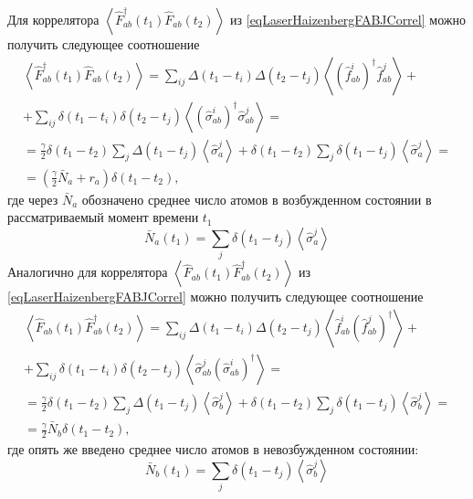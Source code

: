 Для коррелятора 
$\left<\hat{F}_{ab}^{\dag}\left(t_1\right)\hat{F}_{ab}\left(t_2\right)\right>$
из \eqref{eqLaserHaizenbergFABJCorrel} можно получить следующее
соотношение
\begin{eqnarray}
\left<\hat{F}_{ab}^{\dag}\left(t_1\right)\hat{F}_{ab}\left(t_2\right)\right>
= \sum_{ij}\Delta\left(t_1 - t_i\right)\Delta\left(t_2 -
t_j\right)\left<\left(\hat{f}^{i}_{ab}\right)^{\dag}\hat{f}^{j}_{ab}\right>
+
\nonumber \\
+ 
\sum_{ij} \delta\left(t_1 - t_i\right)\delta\left(t_2 - t_j\right)
\left<\left(\hat{\sigma}^{i}_{ab}\right)^{\dag}\hat{\sigma}^{j}_{ab}\right>
= 
\nonumber \\
=
\frac{\gamma}{2}\delta\left(t_1 - t_2\right)\sum_{j}\Delta\left(t_1 -
t_j\right)\left<\hat{\sigma}^{j}_{a}\right> +
\delta\left(t_1 - t_2\right) \sum_{j} \delta\left(t_1 - t_j\right)
\left<\hat{\sigma}^{j}_{a}\right> 
=
\nonumber \\
= 
\left(
\frac{\gamma}{2}\bar{N}_a + r_a
\right)\delta\left(t_1 - t_2\right),
\label{eqLaserHaizenbergFABCorrel_1}
\end{eqnarray}
где через $\bar{N}_a$ обозначено среднее число атомов в возбужденном
состоянии в рассматриваемый момент времени $t_1$
\begin{equation}
\bar{N}_a\left(t_1\right) = \sum_{j} \delta\left(t_1 - t_j\right)
\left<\hat{\sigma}^{j}_{a}\right>
\nonumber 
\end{equation}
Аналогично для коррелятора 
$\left<\hat{F}_{ab}\left(t_1\right)\hat{F}_{ab}^{\dag}\left(t_2\right)\right>$
из \eqref{eqLaserHaizenbergFABJCorrel} можно получить следующее
соотношение
\begin{eqnarray}
\left<\hat{F}_{ab}\left(t_1\right)\hat{F}_{ab}^{\dag}\left(t_2\right)\right>
= \sum_{ij}\Delta\left(t_1 - t_i\right)\Delta\left(t_2 -
t_j\right)\left<\hat{f}^{i}_{ab}\left(\hat{f}^{j}_{ab}\right)^{\dag}\right>
+
\nonumber \\
+ 
\sum_{ij} \delta\left(t_1 - t_i\right)\delta\left(t_2 - t_j\right)
\left<\hat{\sigma}^{j}_{ab}\left(\hat{\sigma}^{i}_{ab}\right)^{\dag}\right>
= 
\nonumber \\
=
\frac{\gamma}{2}\delta\left(t_1 - t_2\right)\sum_{j}\Delta\left(t_1 -
t_j\right)\left<\hat{\sigma}^{j}_{b}\right> +
\delta\left(t_1 - t_2\right) \sum_{j} \delta\left(t_1 - t_j\right)
\left<\hat{\sigma}^{j}_{b}\right> 
=
\nonumber \\
= 
\frac{\gamma}{2}\bar{N}_b\delta\left(t_1 - t_2\right),
\label{eqLaserHaizenbergFABCorrel_2}
\end{eqnarray}
где опять же введено среднее число атомов в невозбужденном состоянии:
\begin{equation}
\bar{N}_b\left(t_1\right) = \sum_{j} \delta\left(t_1 - t_j\right)
\left<\hat{\sigma}^{j}_{b}\right>
\nonumber 
\end{equation}

